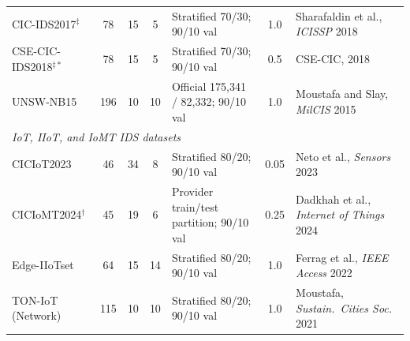 \begin{table}[!ht]
{\begin{tabular}{l c c c l c l}
CIC-IDS2017$^{\ddagger}$
& 78 & 15 & 5
& Stratified 70/30; 90/10 val
& 1.0
& Sharafaldin et al., \textit{ICISSP} 2018 \cite{sharafaldin2018toward} \\

CSE-CIC-IDS2018$^{\ddagger *}$
& 78 & 15 & 5   %
& Stratified 70/30; 90/10 val
& 0.5
& CSE-CIC, 2018 \cite{karatas2020increasing} \\

UNSW-NB15
& 196 & 10 & 10
& Official 175{,}341 / 82{,}332; 90/10 val
& 1.0
& Moustafa and Slay, \textit{MilCIS} 2015 \cite{moustafa2015unsw} \\

\midrule
\multicolumn{7}{l}{\textit{IoT, IIoT, and IoMT IDS datasets}} \\
\midrule

CICIoT2023
& 46 & 34 & 8
& Stratified 80/20; 90/10 val
& 0.05
& Neto et al., \textit{Sensors} 2023 \cite{neto2023ciciot2023} \\

CICIoMT2024$^{\dagger}$
& 45 & 19 & 6
& Provider train/test partition; 90/10 val
& 0.25
& Dadkhah et al., \textit{Internet of Things} 2024 \cite{dadkhah2024ciciomt2024} \\

Edge-IIoTset
& 64 & 15 & 14  %
& Stratified 80/20; 90/10 val
& 1.0
& Ferrag et al., \textit{IEEE Access} 2022 \cite{ferrag2022edge} \\

TON-IoT (Network)
& 115 & 10 & 10
& Stratified 80/20; 90/10 val
& 1.0
& Moustafa, \textit{Sustain.\ Cities Soc.} 2021 \cite{moustafa2021new} \\

\bottomrule
\end{tabular}}
\end{table}
